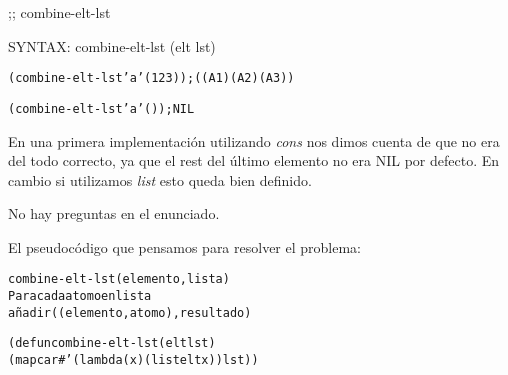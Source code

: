 \begin{aibox}{\function}
;; combine-elt-lst

SYNTAX: combine-elt-lst (elt lst)
\end{aibox}

\begin{aibox}{\examples}

\begin{alltt}
(combine-elt-lst 'a '(1 2 3)); ((A 1) (A 2) (A 3))

(combine-elt-lst 'a '()); NIL
\end{alltt}

\end{aibox}

\begin{aibox}{\comments}
En una primera implementación utilizando \emph{cons} nos dimos cuenta de que no era del todo correcto, ya que el rest del último elemento no era NIL por defecto. En cambio si utilizamos \emph{list} esto queda bien definido.
\end{aibox}
\begin{aibox}{\answers}
No hay preguntas en el enunciado.
\end{aibox}
\begin{aibox}{\othercomments}

\end{aibox}
\begin{aibox}{\pseudocode}
El pseudocódigo que pensamos para resolver el problema:

\begin{alltt}
combine-elt-lst (elemento,lista)
    Para cada atomo en lista
        añadir ((elemento,atomo),resultado)
\end{alltt}
\end{aibox}
\begin{aibox}{\code}

\begin{alltt}

(defun combine-elt-lst (elt lst)
            (mapcar #'(lambda (x) (list elt x)) lst))

\end{alltt}
\end{aibox}
